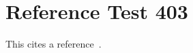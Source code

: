 \documentclass{article}
\begin{document}
\section{Reference Test 403}
This cites a reference~\cite{test403}.

\end{document}
